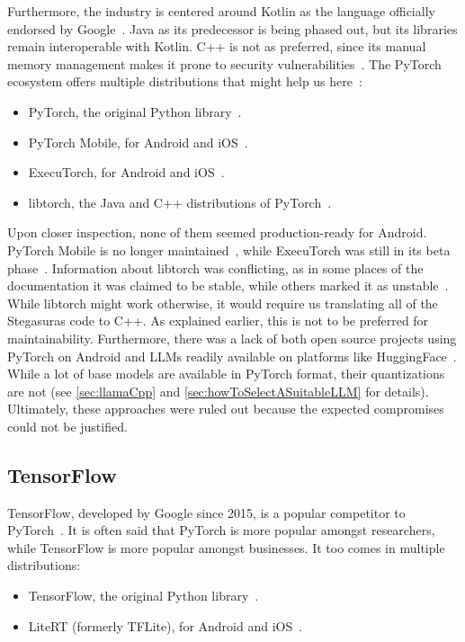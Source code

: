 Furthermore, the industry is centered around Kotlin as the language officially endorsed by Google~\cite{ruggiaDarkSideNative2025}. Java as its predecessor is being phased out, but its libraries remain interoperable with Kotlin. C++ is not as preferred, since its manual memory management makes it prone to security vulnerabilities~\cite{ruggiaDarkSideNative2025}. The PyTorch ecosystem offers multiple distributions that might help us here~\cite{pytorchPyTorch}:
\begin{itemize}
	\item PyTorch, the original Python library~\cite{anselPyTorch2Faster2024}.
	\item PyTorch Mobile, for Android and iOS~\cite{pytorchPytorchAndroiddemoapp2025}.
	\item ExecuTorch, for Android and iOS~\cite{pytorchPytorchExecutorch2025}.
	\item libtorch, the Java and C++ distributions of PyTorch~\cite{pytorchStartLocally,pytorchPyTorchAPIPyTorch}.
\end{itemize}

Upon closer inspection, none of them seemed production-ready for Android. PyTorch Mobile is no longer maintained~\cite{pytorchPytorchAndroiddemoapp2025}, while ExecuTorch was still in its beta phase~\cite{pytorchPytorchExecutorch2025}. Information about libtorch was conflicting, as in some places of the documentation it was claimed to be stable, while others marked it as unstable~\cite{pytorchStartLocally,pytorchPyTorchAPIPyTorch}. While libtorch might work otherwise, it would require us translating all of the Stegasuras code to C++. As explained earlier, this is not to be preferred for maintainability. Furthermore, there was a lack of both open source projects using PyTorch on Android and \glspl{LLM} readily available on platforms like HuggingFace~\cite{huggingfaceModelsHuggingFace2025}. While a lot of base models are available in PyTorch format, their quantizations are not (see \cref{sec:llamaCpp} and \cref{sec:howToSelectASuitableLLM} for details). Ultimately, these approaches were ruled out because the expected compromises could not be justified.

\subsection{TensorFlow}
\label{sec:tensorFlow}
TensorFlow, developed by Google since 2015, is a popular competitor to PyTorch~\cite{abadiTensorFlowLargescaleMachine2015}. It is often said that PyTorch is more popular amongst researchers, while TensorFlow is more popular amongst businesses. It too comes in multiple distributions:
\begin{itemize}
	\item TensorFlow, the original Python library~\cite{abadiTensorFlowLargescaleMachine2015}.
	\item LiteRT (formerly TFLite), for Android and iOS~\cite{googleaiedgeteamTensorFlowLiteNow2024,googleGoogleaiedgeLiteRT2025}.
\end{itemize}

